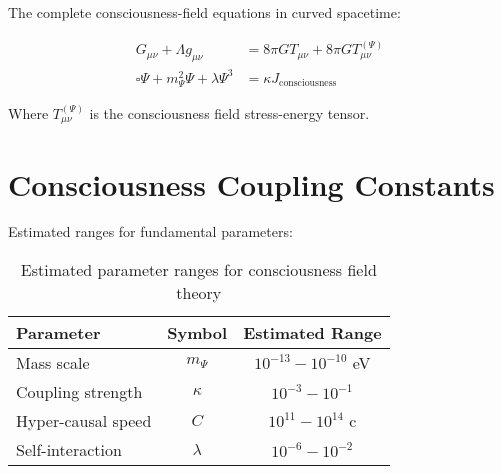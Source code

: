 \documentclass[12pt,article]{memoir}
\begin{document}
The complete consciousness-field equations in curved spacetime:

\begin{align}
G_{\mu\nu} + \Lambda g_{\mu\nu} &= 8\pi G T_{\mu\nu} + 8\pi G T_{\mu\nu}^{(\Psi)} \\
\square\Psi + m_\Psi^2\Psi + \lambda\Psi^3 &= \kappa J_{\text{consciousness}}
\end{align}

Where $T_{\mu\nu}^{(\Psi)}$ is the consciousness field stress-energy tensor.

\section{Consciousness Coupling Constants}

Estimated ranges for fundamental parameters:

\begin{table}[h]
\centering
\begin{tabular}{@{}lcc@{}}
\toprule
Parameter & Symbol & Estimated Range \\
\midrule
Mass scale & $m_\Psi$ & $10^{-13} - 10^{-10}$ eV \\
Coupling strength & $\kappa$ & $10^{-3} - 10^{-1}$ \\
Hyper-causal speed & $C$ & $10^{11} - 10^{14}$ c \\
Self-interaction & $\lambda$ & $10^{-6} - 10^{-2}$ \\
\bottomrule
\end{tabular}
\caption{Estimated parameter ranges for consciousness field theory}
\end{table}



\end{document}
